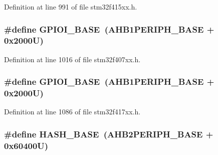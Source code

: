 Definition at line 991 of file stm32f415xx.\+h.

\subsubsection[{\texorpdfstring{G\+P\+I\+O\+I\+\_\+\+B\+A\+SE}{GPIOI_BASE}}]{\setlength{\rightskip}{0pt plus 5cm}\#define G\+P\+I\+O\+I\+\_\+\+B\+A\+SE~({\bf A\+H\+B1\+P\+E\+R\+I\+P\+H\+\_\+\+B\+A\+SE} + 0x2000\+U)}\hypertarget{group___peripheral__registers__structures_ga50acf918c2e1c4597d5ccfe25eb3ad3d}{}\label{group___peripheral__registers__structures_ga50acf918c2e1c4597d5ccfe25eb3ad3d}


Definition at line 1016 of file stm32f407xx.\+h.

\subsubsection[{\texorpdfstring{G\+P\+I\+O\+I\+\_\+\+B\+A\+SE}{GPIOI_BASE}}]{\setlength{\rightskip}{0pt plus 5cm}\#define G\+P\+I\+O\+I\+\_\+\+B\+A\+SE~({\bf A\+H\+B1\+P\+E\+R\+I\+P\+H\+\_\+\+B\+A\+SE} + 0x2000\+U)}\hypertarget{group___peripheral__registers__structures_ga50acf918c2e1c4597d5ccfe25eb3ad3d}{}\label{group___peripheral__registers__structures_ga50acf918c2e1c4597d5ccfe25eb3ad3d}


Definition at line 1086 of file stm32f417xx.\+h.

\subsubsection[{\texorpdfstring{H\+A\+S\+H\+\_\+\+B\+A\+SE}{HASH_BASE}}]{\setlength{\rightskip}{0pt plus 5cm}\#define H\+A\+S\+H\+\_\+\+B\+A\+SE~({\bf A\+H\+B2\+P\+E\+R\+I\+P\+H\+\_\+\+B\+A\+SE} + 0x60400\+U)}\hypertarget{group___peripheral__registers__structures_ga398d121ca28c3f0f90a140b62184e242}{}\label{group___peripheral__registers__structures_ga398d121ca28c3f0f90a140b62184e242}



